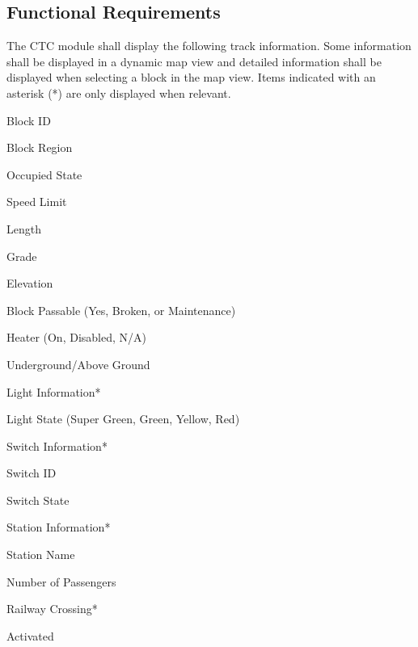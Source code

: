 \documentclass{scrreprt}
\begin{document}
\subsection{Functional Requirements}
\begin{numonly}
    \item The CTC module shall display the following track information. Some information
    shall be displayed in a dynamic map view and detailed information shall be displayed
    when selecting a block in the map view. Items indicated with an asterisk (*) are only 
    displayed when relevant. 
    \begin{numonly}
        \item Block ID
        \item Block Region
        \item Occupied State
        \item Speed Limit
        \item Length
        \item Grade
        \item Elevation
        \item Block Passable (Yes, Broken, or Maintenance)
        \item Heater (On, Disabled, N/A)
        \item Underground/Above Ground
        \item Light Information* 
        \begin{numonly}
            \item Light State (Super Green, Green, Yellow, Red)
        \end{numonly}
        \item Switch Information* 
        \begin{numonly}
            \item Switch ID
            \item Switch State
        \end{numonly}
        \item Station Information* 
        \begin{numonly}
            \item Station Name
            \item Number of Passengers
        \end{numonly}
        \item Railway Crossing*
        \begin{numonly}
          \item Activated
        \end{numonly}

\end{numonly}
\end{numonly}
\end{document}
